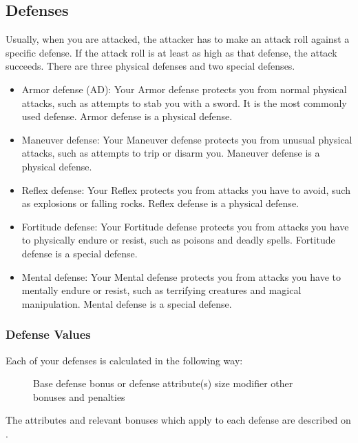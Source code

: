 \subsection{Defenses}\label{Defenses}
Usually, when you are attacked, the attacker has to make an attack roll against a specific defense. If the attack roll is at least as high as that defense, the attack succeeds. There are three physical defenses and two special defenses.
\begin{itemize}
    \item Armor defense (AD): Your Armor defense protects you from normal physical attacks, such as attempts to stab you with a sword. It is the most commonly used defense. Armor defense is a physical defense.
    \item Maneuver defense: Your Maneuver defense protects you from unusual physical attacks, such as attempts to trip or disarm you. Maneuver defense is a physical defense.
    \item Reflex defense: Your Reflex protects you from attacks you have to avoid, such as explosions or falling rocks. Reflex defense is a physical defense.
    \item Fortitude defense: Your Fortitude defense protects you from attacks you have to physically endure or resist, such as poisons and deadly spells. Fortitude defense is a special defense. 
    \item Mental defense: Your Mental defense protects you from attacks you have to mentally endure or resist, such as terrifying creatures and magical manipulation. Mental defense is a special defense.
\end{itemize}

\subsubsection{Defense Values}

Each of your defenses is calculated in the following way:

\begin{figure}[h]
     \add Base defense bonus or defense attribute(s)  \add size modifier \add other bonuses and penalties
\end{figure}

The attributes and relevant bonuses which apply to each defense are described on .

